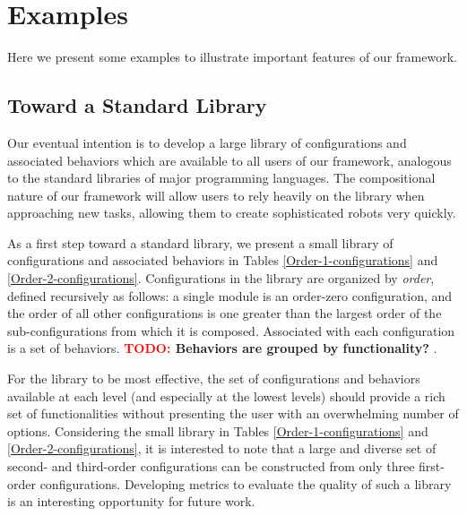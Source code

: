 \documentclass[conference]{IEEEtran}
\theoremstyle{definition}
\newcommand{\TODO}[1]{ {\bf \textcolor{red}{TODO:} #1 }}
\begin{document}
\section{Examples}
Here we present some examples to illustrate important features of our framework.
\subsection{Toward a Standard Library}
Our eventual intention is to develop a large library of configurations and associated
behaviors which are available to all users of our framework, analogous to the standard
libraries of major programming languages.  The compositional nature of our framework
will allow users to rely heavily on the library when approaching new tasks, allowing
them to create sophisticated robots very quickly.

As a first step toward a standard library, we present a small library of configurations
and associated behaviors in Tables \ref{Order-1-configurations} and \ref{Order-2-configurations}.
Configurations in the library are organized by \textit{order}, defined recursively
as follows: a single module is an order-zero configuration, and the order of all
other configurations is one greater than the largest order of the sub-configurations
from which it is composed. Associated with each configuration is a set of behaviors. \TODO{Behaviors are grouped
by functionality?}.

For the library to be most effective, the set of configurations and behaviors available
 at each level (and especially at the lowest levels) should provide a rich set of
 functionalities without presenting the user with an overwhelming number of options. 
 Considering the small library in Tables \ref{Order-1-configurations} and \ref{Order-2-configurations},
 it is interested to note that a large  and diverse set of second- and third-order configurations can
be constructed from only three first-order configurations. Developing metrics to
evaluate the quality of such a library is an interesting opportunity for future work. 
\end{document}

